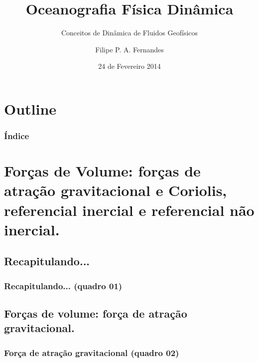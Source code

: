 \title[Aula 03]{Oceanografia Física Dinâmica}
\subtitle{Conceitos de Dinâmica de Fluidos Geofísicos}
\author[Filipe Fernandes]{Filipe P. A. Fernandes}
\date[Fevereiro 2014]{24 de Fevereiro 2014}




\begin{frame}[plain]
  \titlepage
\end{frame}

\section*{Outline}
\begin{frame}
\frametitle{Índice}
\tableofcontents
\end{frame}

\section{Forças de Volume: forças de atração gravitacional e Coriolis, referencial inercial e referencial não inercial.}

\subsection{Recapitulando...}
\begin{frame}
\frametitle{Recapitulando... (quadro 01)}
  \begin{center}
  \end{center}
\end{frame}

\subsection{Forças de volume: força de atração gravitacional.}
\begin{frame}
\frametitle{Força de atração gravitacional (quadro 02)}
  \begin{center}
  \end{center}
\end{frame}

